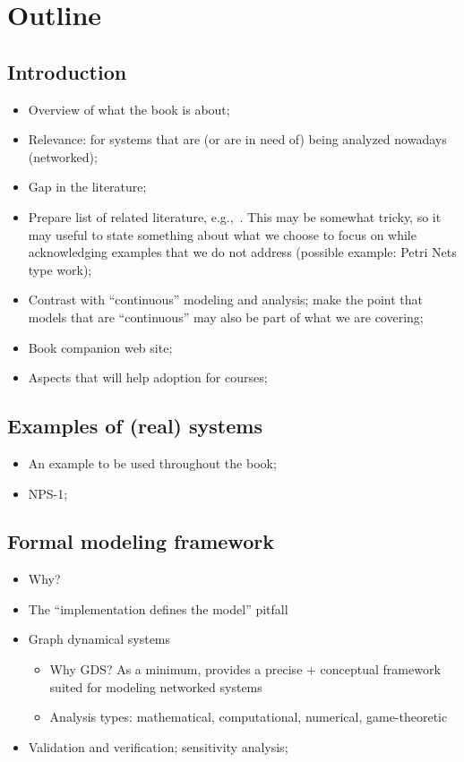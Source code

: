 \documentclass[12pt]{book}
\begin{document}
\chapter{Outline}

\section{Introduction}

\begin{itemize}
\item Overview of what the book is about;
\item Relevance: for systems that are (or are in need of) being
  analyzed nowadays (networked);
\item Gap in the literature;
\item Prepare list of related literature, e.g.,~\cite{Law:07}. This
  may be somewhat tricky, so it may useful to state something about
  what we choose to focus on while acknowledging examples that we do
  not address (possible example: Petri Nets type work);
\item Contrast with ``continuous'' modeling and analysis; make the
  point that models that are ``continuous'' may also be part of what
  we are covering;
\item Book companion web site;
\item Aspects that will help adoption for courses;
\end{itemize}

\section{Examples of (real) systems}

\begin{itemize}
\item An example to be used throughout the book;
\item NPS-1;
\end{itemize}

\section{Formal modeling framework}

\begin{itemize}
\item Why?
\item The ``implementation defines the model'' pitfall
\item Graph dynamical systems
  \begin{itemize}
  \item Why GDS? As a minimum, provides a precise + conceptual
    framework suited for modeling networked systems
  \item Analysis types: mathematical, computational, numerical,
    game-theoretic
  \end{itemize}
\item Validation and verification; sensitivity analysis;
\end{itemize}
\end{document}
